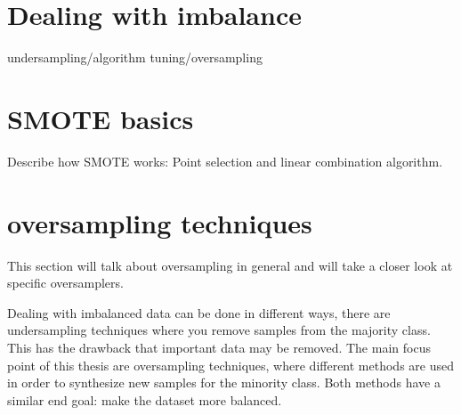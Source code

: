 
\section{Dealing with imbalance}
undersampling/algorithm tuning/oversampling

\section{SMOTE basics}

Describe how SMOTE works: Point selection and linear combination algorithm.

\section{oversampling techniques}
This section will talk about oversampling in general and will take a closer look at specific oversamplers.

Dealing with imbalanced data can be done in different ways, there are undersampling techniques where you remove samples from the majority class. This has the drawback that important data may be removed. The main focus point of this thesis are oversampling techniques, where different methods are used in order to synthesize new samples for the minority class. Both methods have a similar end goal: make the dataset more balanced.